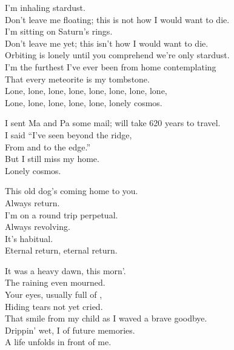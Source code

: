 
I'm inhaling stardust. \\
Don't leave me floating; this is not how I would want to die. \\
I'm sitting on Saturn's rings. \\
Don't leave me yet; this isn't how I would want to die. \\
Orbiting is lonely until you comprehend we're only stardust. \\
I'm the furthest I've ever been from home contemplating \\
That every meteorite is my tombstone. \\

Lone, lone, lone, lone, lone, lone, lone, lone, \\
Lone, lone, lone, lone, lone, lonely cosmos. \\


I sent Ma and Pa some mail; will take 620 years to travel. \\
I said ``I've seen beyond the ridge, \\
From  and to the edge.'' \\
But I still miss my home. \\
Lonely cosmos. \\





This old dog's coming home to you. \\
Always return. \\
I'm on a round trip perpetual. \\
Always revolving. \\
It's habitual. \\
Eternal return, eternal return. \\


It was a heavy dawn, this morn'. \\
The raining  even mourned. \\
Your eyes, usually full of , \\
Hiding tears not yet cried. \\
That smile from my child as I waved a brave goodbye. \\
Drippin' wet, I  of future memories. \\
A life unfolds in front of me. \\

